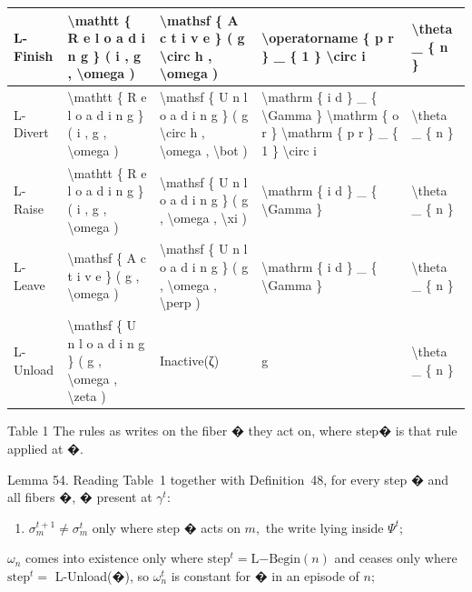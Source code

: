 \documentclass[
  10
]{article}
\providecommand{\tightlist}{%
  \setlength{\itemsep}{0pt}\setlength{\parskip}{0pt}}
\begin{document}
{\begin{longtable}[]{@{}|l|l|l|l|l|@{}}
L-Finish & \textbackslash mathtt \{ R e l o a d i n g \} ( i , g ,
\textbackslash omega ) & \textbackslash mathsf \{ A c t i v e \} ( g
\textbackslash circ h , \textbackslash omega ) &
\textbackslash operatorname \{ p r \} \_ \{ 1 \} \textbackslash circ i &
\textbackslash theta \_ \{ n \} \\
\hline
L-Divert & \textbackslash mathtt \{ R e l o a d i n g \} ( i , g ,
\textbackslash omega ) & \textbackslash mathsf \{ U n l o a d i n g \} (
g \textbackslash circ h , \textbackslash omega , \textbackslash bot ) &
\textbackslash mathrm \{ i d \} \_ \{ \textbackslash Gamma \}
\textbackslash mathrm \{ o r \} \textbackslash mathrm \{ p r \} \_ \{ 1
\} \textbackslash circ i & \textbackslash theta \_ \{ n \} \\
\hline
L-Raise & \textbackslash mathtt \{ R e l o a d i n g \} ( i , g ,
\textbackslash omega ) & \textbackslash mathsf \{ U n l o a d i n g \} (
g , \textbackslash omega , \textbackslash xi ) & \textbackslash mathrm
\{ i d \} \_ \{ \textbackslash Gamma \} & \textbackslash theta \_ \{ n
\} \\
\hline
L-Leave & \textbackslash mathsf \{ A c t i v e \} ( g ,
\textbackslash omega ) & \textbackslash mathsf \{ U n l o a d i n g \} (
g , \textbackslash omega , \textbackslash perp ) & \textbackslash mathrm
\{ i d \} \_ \{ \textbackslash Gamma \} & \textbackslash theta \_ \{ n
\} \\
\hline
L-Unload & \textbackslash mathsf \{ U n l o a d i n g \} ( g ,
\textbackslash omega , \textbackslash zeta ) & Inactive(ζ) & g &
\textbackslash theta \_ \{ n \} \\
\hline
\end{longtable}
}

Table 1 \textbar{} The rules as writes on the fiber � they act on, where
step� is that rule applied at �.

Lemma 54. Reading Table~1 together with Definition~48, for every step �
and all fibers �, � present at \(\gamma ^ { t } \colon\)

\begin{enumerate}
\def\labelenumi{\arabic{enumi}.}
\tightlist
\item
  \(\sigma _ { m } ^ { t + 1 } \neq \sigma _ { m } ^ { t }\) only where
  step � acts on \(m ,\) the write lying inside \(\Psi ^ { t } ;\)
\end{enumerate}

\(\omega _ { n }\) comes into existence only where
\(\mathrm { s t e p } ^ { t } = \mathrm { L } \mathrm { - B e g i n } ( n )\)
and ceases only where \(\mathrm { s t e p } ^ { t } =\) L-Unload(�), so
\(\omega _ { n } ^ { t }\) is constant for � in an episode of \(n ;\)
\end{document}
